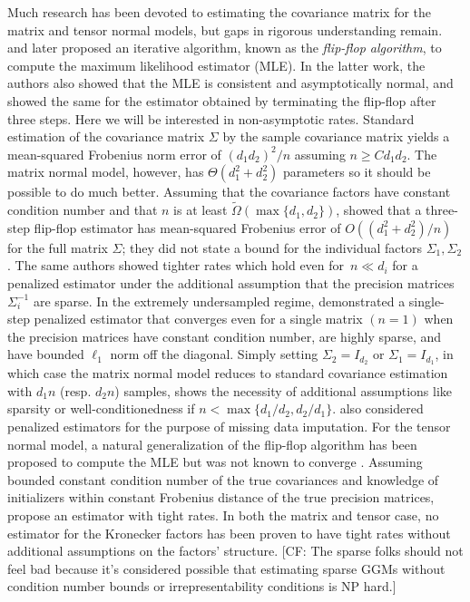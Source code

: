 \documentclass[aos]{imsart}
\theoremstyle{definition}
\numberwithin{equation}{section}
\newcommand{\CF}[1]{{\color{purple}[CF: #1]}}
\begin{document}
Much research has been devoted to estimating the covariance matrix for the matrix and tensor normal models, but gaps in rigorous understanding remain.
\cite{dutilleul1999mle} and later \cite{werner2008estimation} proposed an iterative algorithm, known as the \emph{flip-flop algorithm}, to compute the maximum likelihood estimator (MLE).
In the latter work, the authors also showed that the MLE is consistent and asymptotically normal, and showed the same for the estimator obtained by terminating the flip-flop after three steps.
Here we will be interested in non-asymptotic rates.
Standard estimation of the covariance matrix $\Sigma$ by the sample covariance matrix yields a mean-squared Frobenius norm error of $(d_1 d_2)^2/n$ assuming $n \geq C d_1 d_2$.
The matrix normal model, however, has $\Theta(d_1^2 + d_2^2)$ parameters so it should be possible to do much better.
Assuming that the covariance factors have constant condition number and that $n$ is at least $\tilde{\Omega}(\max\{d_1,d_2\})$, \cite{tsiligkaridis2013convergence} showed that a three-step flip-flop estimator has mean-squared Frobenius error of $O((d_1^2 + d_2^2)/n)$ for the full matrix $\Sigma$; they did not state a bound for the individual factors $\Sigma_1,\Sigma_2$.
The same authors showed tighter rates which hold even for~$n\ll d_i$ for a penalized estimator under the additional assumption that the precision matrices $\Sigma_i^{-1}$ are sparse.
In the extremely undersampled regime, \cite{zhou2014gemini} demonstrated a single-step penalized estimator that converges even for a single matrix $(n=1)$ when the precision matrices have constant condition number, are highly sparse, and have bounded $\ell_1$ norm off the diagonal.
Simply setting $\Sigma_2 = I_{d_2}$ or $\Sigma_1 = I_{d_1}$, in which case the matrix normal model reduces to standard covariance estimation with $d_1 n$ (resp. $d_2 n$) samples, shows the necessity of additional assumptions like sparsity or well-conditionedness if $n < \max\{d_1/d_2, d_2/d_1\}$.
\cite{allen2010transposable} also considered penalized estimators for the purpose of missing data imputation.
For the tensor normal model, a natural generalization of the flip-flop algorithm has been proposed to compute the MLE but was not known to converge \citep{mardia1993spatial,manceur2013maximum}.
Assuming bounded constant condition number of the true covariances and knowledge of initializers within constant Frobenius distance of the true precision matrices, \cite{sun2015nonconvex} propose an estimator with tight rates.
In both the matrix and tensor case, no estimator for the Kronecker factors has been proven to have tight rates without additional assumptions on the factors' structure.
\CF{The sparse folks should not feel bad because it's considered possible that estimating sparse GGMs without condition number bounds or irrepresentability conditions is NP hard.}
\end{document}
